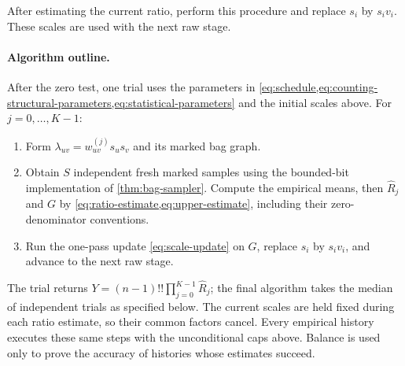 \documentclass[11pt]{article}
\theoremstyle{definition}
\theoremstyle{remark}
\numberwithin{equation}{section}
\begin{document}
After estimating the current ratio, perform this procedure and replace
$s_i$ by $s_i v_i$. These scales are used with the next raw stage.

\paragraph{Algorithm outline.}
After the zero test, one trial uses the parameters in
\cref{eq:schedule,eq:counting-structural-parameters,eq:statistical-parameters}
and the initial scales above. For $j=0,\ldots,K-1$:
\begin{enumerate}[label=\textup{\arabic*.},leftmargin=*]
\item Form $\lambda_{uv}=w^{(j)}_{uv}s_us_v$ and its marked bag graph.
\item Obtain $S$ independent fresh marked samples using the bounded-bit
implementation of \cref{thm:bag-sampler}. Compute the empirical
means, then $\widehat R_j$ and $G$ by
\cref{eq:ratio-estimate,eq:upper-estimate}, including their
zero-denominator conventions.
\item Run the one-pass update \eqref{eq:scale-update} on $G$, replace
$s_i$ by $s_iv_i$, and advance to the next raw stage.
\end{enumerate}
The trial returns $Y=(n-1)!!\prod_{j=0}^{K-1}\widehat R_j$;
the final algorithm takes the median of independent trials as specified
below. The current scales are held fixed during each ratio estimate,
so their common factors cancel. Every empirical history executes these
same steps with the unconditional caps above. Balance is used only to
prove the accuracy of histories whose estimates succeed.
\end{document}
